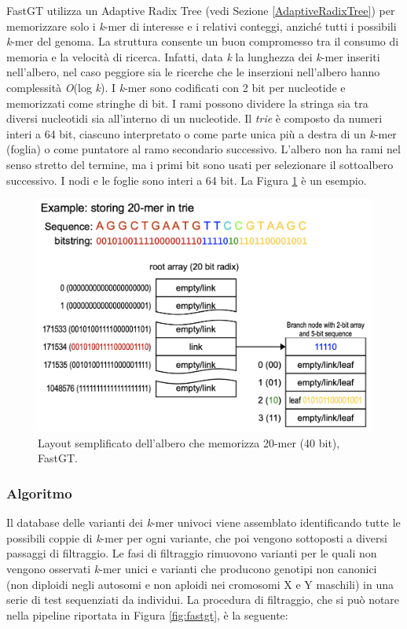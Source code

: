 \documentclass[../main.tex]{subfiles}
\begin{document}
\noindent
FastGT utilizza un Adaptive Radix Tree (vedi Sezione \ref{AdaptiveRadixTree}) per memorizzare solo i \textit{k}-mer di interesse e i relativi conteggi, anziché tutti i possibili \textit{k}-mer del genoma. La struttura consente un buon compromesso tra il consumo di memoria e la velocità di ricerca. Infatti, data \textit{k} la lunghezza dei \textit{k}-mer inseriti nell'albero, nel caso peggiore sia le ricerche che le inserzioni nell'albero hanno complessità \textit{O}(log \textit{k}). I \textit{k}-mer sono codificati con 2 bit per nucleotide e memorizzati come stringhe di bit. I rami possono dividere la stringa sia tra diversi nucleotidi sia all'interno di un nucleotide. Il \textit{trie} è composto da numeri interi a 64 bit, ciascuno interpretato o come parte unica più a destra di un \textit{k}-mer (foglia) o come puntatore al ramo secondario successivo. L'albero non ha rami nel senso stretto del termine, ma i primi bit sono usati per selezionare il sottoalbero successivo. I nodi e le foglie sono interi a 64 bit. La Figura \ref{fig:art} è un esempio.

\begin{figure}[h!]
	\centering
  	\captionsetup{justification=centering}
  	\includegraphics[scale=.35]{images/fastgt-art.png}
  	\caption{Layout semplificato dell'albero che memorizza 20-mer (40 bit), FastGT.}
  	\label{fig:art}
\end{figure}


\subsubsection{Algoritmo}

Il database delle varianti dei \textit{k}-mer univoci viene assemblato identificando tutte le possibili coppie di \textit{k}-mer per ogni variante, che poi vengono sottoposti a diversi passaggi di filtraggio. Le fasi di filtraggio rimuovono varianti per le quali non vengono osservati \textit{k}-mer unici e varianti che producono genotipi non canonici (non diploidi negli autosomi e non aploidi nei cromosomi X e Y maschili) in una serie di test sequenziati da individui. La procedura di filtraggio, che si può notare nella pipeline riportata in Figura \ref{fig:fastgt}, è la seguente:
\end{document}
